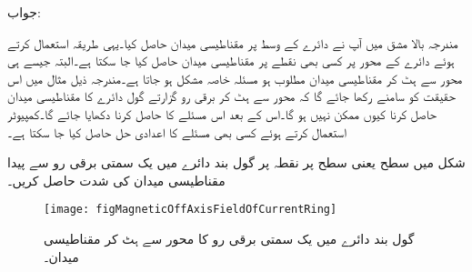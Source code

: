 جواب: 

مندرجہ بالا مشق میں آپ نے دائرے کے وسط پر مقناطیسی میدان حاصل کیا۔یہی طریقہ استعمال کرتے ہوئے دائرے کے محور پر کسی بھی نقطے پر مقناطیسی میدان حاصل کیا جا سکتا ہے۔البتہ جیسے ہی محور سے ہٹ کر مقناطیسی میدان مطلوب ہو مسئلہ خاصہ مشکل ہو جاتا ہے۔مندرجہ ذیل مثال میں اس حقیقت کو سامنے رکھا جائے گا کہ محور سے ہٹ کر برقی رو گزارتے گول دائرے کا مقناطیسی میدان حاصل کرنا کیوں ممکن نہیں ہو گا۔اس کے بعد  اس مسئلے کا  حاصل کرنا دکھایا جائے گا۔کمپیوٹر استعمال کرتے ہوئے کسی بھی مسئلے کا اعدادی حل حاصل کیا جا سکتا ہے۔

شکل  میں  سطح یعنی  سطح پر نقطہ  پر گول بند دائرے میں یک سمتی برقی رو سے پیدا مقناطیسی میدان کی شدت حاصل کریں۔ 
\begin{figure}
\centering
\texttt{[image: figMagneticOffAxisFieldOfCurrentRing]}
\caption{گول بند دائرے میں یک سمتی برقی رو کا محور سے ہٹ کر مقناطیسی میدان۔}
\label{شکل_مقناطیسی_دائرہ_محور_سے_ہٹ_کر}
\end{figure}

